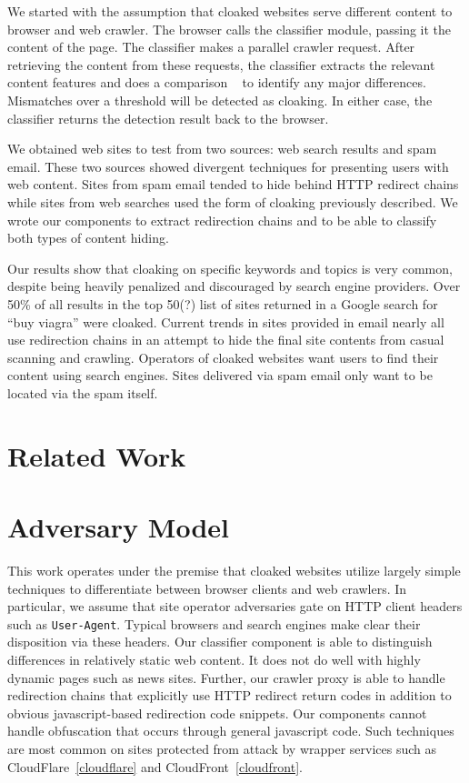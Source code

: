 \documentclass[letterpaper,twocolumn,10pt]{article}
\begin{document}
We started with the assumption that cloaked websites serve different content to browser and web crawler.  The browser calls the classifier module, passing it the content of the page.  The classifier makes a parallel crawler request. After retrieving the content from these requests, the classifier extracts the relevant content features and does a comparison ~\cite{cloak} to identify any major differences.  Mismatches over a threshold will be detected as cloaking.  In either case, the classifier returns the detection result back to the browser.

We obtained web sites to test from two sources: web search results and spam email.  These two sources showed divergent techniques for presenting users with web content.  Sites from spam email tended to hide behind HTTP redirect chains while sites from web searches used the form of cloaking previously described.  We wrote our components to extract redirection chains and to be able to classify both types of content hiding.

Our results show that cloaking on specific keywords and topics is very common, despite being heavily penalized and discouraged by search engine providers. Over 50\% of all results in the top 50(?) list of sites returned in a Google search for ``buy viagra'' were cloaked. Current trends in sites provided in email nearly all use redirection chains in an attempt to hide the final site contents from casual scanning and crawling.  Operators of cloaked websites want users to find their content using search engines.  Sites delivered via spam email only want to be located via the spam itself.

\section{Related Work}

\section{Adversary Model}

This work operates under the premise that cloaked websites utilize largely simple techniques to differentiate between browser clients and web crawlers. In particular, we assume that site operator adversaries gate on HTTP client headers such as \texttt{User-Agent}.  Typical browsers and search engines make clear their disposition via these headers.  Our classifier component is able to distinguish differences in relatively static web content.  It does not do well with highly dynamic pages such as news sites.  Further, our crawler proxy is able to handle redirection chains that explicitly use HTTP redirect return codes in addition to obvious javascript-based redirection code snippets.  Our components cannot handle obfuscation that occurs through general javascript code.  Such techniques are most common on sites protected from attack by wrapper services such as CloudFlare~\ref{cloudflare} and CloudFront~\ref{cloudfront}.
\end{document}
